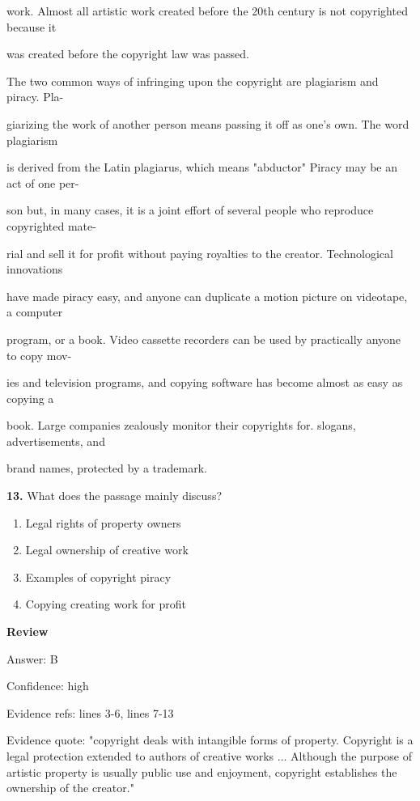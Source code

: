 \documentclass[12pt]{article}
\begin{document}
work. Almost all artistic work created before the 20th century is not copyrighted because it\par
was created before the copyright law was passed.\par
The two common ways of infringing upon the copyright are plagiarism and piracy. Pla-\par
giarizing the work of another person means passing it off as one's own. The word plagiarism\par
is derived from the Latin plagiarus, which means "abductor" Piracy may be an act of one per-\par
son but, in many cases, it is a joint effort of several people who reproduce copyrighted mate-\par
rial and sell it for profit without paying royalties to the creator. Technological innovations\par
have made piracy easy, and anyone can duplicate a motion picture on videotape, a computer\par
program, or a book. Video cassette recorders can be used by practically anyone to copy mov-\par
ies and television programs, and copying software has become almost as easy as copying a\par
book. Large companies zealously monitor their copyrights for. slogans, advertisements, and\par
brand names, protected by a trademark.\par
\endgroup
\medskip
\noindent\textbf{13.} What does the passage mainly discuss?
\begin{enumerate}[label=(\Alph*),leftmargin=*,itemsep=0.2em]
\item Legal rights of property owners
\item Legal ownership of creative work
\item Examples of copyright piracy
\item Copying creating work for profit
\end{enumerate}
\par
\begingroup
\setlength{\parskip}{0pt}
\setlength{\parindent}{0pt}
\textbf{Review}\par
Answer: B\par
Confidence: high\par
Evidence refs: lines 3-6, lines 7-13\par
Evidence quote: "copyright deals with intangible forms of property. Copyright is a legal protection extended to authors of creative works ... Although the purpose of artistic property is usually public use and enjoyment, copyright establishes the ownership of the creator."\par
\end{document}
